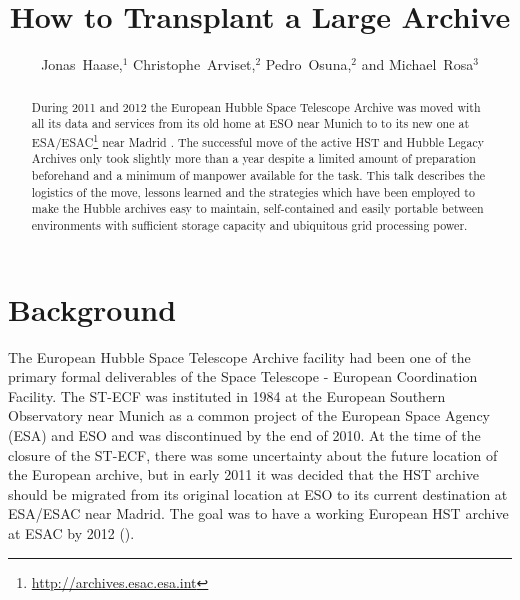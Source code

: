
\resetcounters




\title{How to Transplant a Large Archive}
\author{Jonas~Haase,$^1$ Christophe~Arviset,$^2$ Pedro~Osuna,$^2$ and Michael~Rosa$^3$}


\begin{abstract}
During 2011 and 2012 the European Hubble Space Telescope Archive was moved with all its data and services from its old home at ESO near Munich to to its new one at ESA/ESAC\footnote{\url{http://archives.esac.esa.int}} near Madrid . The successful move of the active HST and Hubble Legacy Archives only took slightly more than a year despite a limited amount of preparation beforehand and a minimum of manpower available for the task.
This talk describes the logistics of the move, lessons learned and the strategies which have been employed to make the Hubble archives easy to maintain, self-contained and easily portable between environments with sufficient storage capacity and ubiquitous grid processing power.


\end{abstract}

\section{Background}

The European Hubble Space Telescope Archive facility had been one of the primary formal deliverables of the Space Telescope - European Coordination Facility. The ST-ECF was instituted in 1984 at the European Southern Observatory near Munich as a common project of the European Space Agency (ESA) and ESO and was discontinued by the end of 2010. 
At the time of the closure of the ST-ECF, there was some uncertainty about the future location of the European archive, but in early 2011 it was decided that the HST archive should be migrated from its original location at ESO to its current destination at ESA/ESAC near Madrid. The goal was to have a working European HST archive at ESAC by 2012 (\cite{2012ASPC..461..677H}). 

